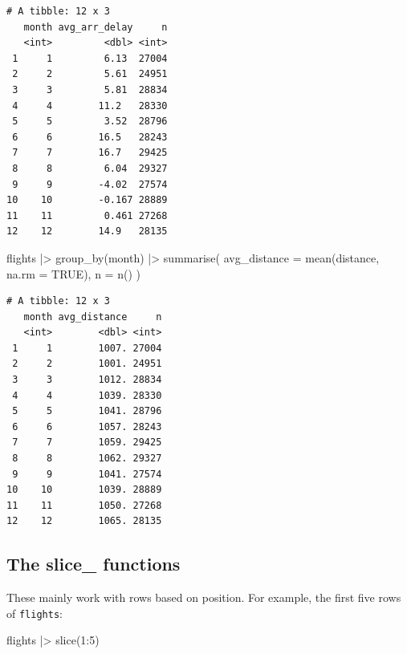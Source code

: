 \documentclass[
  letterpaper,
  DIV=11,
  numbers=noendperiod]{scrreprt}
\newenvironment{Shaded}{\begin{snugshade}}{\end{snugshade}}
\newcommand{\AttributeTok}[1]{\textcolor[rgb]{0.40,0.45,0.13}{#1}}
\newcommand{\ConstantTok}[1]{\textcolor[rgb]{0.56,0.35,0.01}{#1}}
\newcommand{\DecValTok}[1]{\textcolor[rgb]{0.68,0.00,0.00}{#1}}
\newcommand{\FunctionTok}[1]{\textcolor[rgb]{0.28,0.35,0.67}{#1}}
\newcommand{\NormalTok}[1]{\textcolor[rgb]{0.00,0.23,0.31}{#1}}
\newcommand{\SpecialCharTok}[1]{\textcolor[rgb]{0.37,0.37,0.37}{#1}}
\begin{document}
\begin{verbatim}
# A tibble: 12 x 3
   month avg_arr_delay     n
   <int>         <dbl> <int>
 1     1         6.13  27004
 2     2         5.61  24951
 3     3         5.81  28834
 4     4        11.2   28330
 5     5         3.52  28796
 6     6        16.5   28243
 7     7        16.7   29425
 8     8         6.04  29327
 9     9        -4.02  27574
10    10        -0.167 28889
11    11         0.461 27268
12    12        14.9   28135
\end{verbatim}

\begin{Shaded}
\begin{Highlighting}[]
\NormalTok{flights }\SpecialCharTok{|\textgreater{}}
  \FunctionTok{group\_by}\NormalTok{(month) }\SpecialCharTok{|\textgreater{}}
  \FunctionTok{summarise}\NormalTok{(}
    \AttributeTok{avg\_distance =} \FunctionTok{mean}\NormalTok{(distance, }\AttributeTok{na.rm =} \ConstantTok{TRUE}\NormalTok{),}
    \AttributeTok{n =} \FunctionTok{n}\NormalTok{()}
\NormalTok{  )}
\end{Highlighting}
\end{Shaded}

\begin{verbatim}
# A tibble: 12 x 3
   month avg_distance     n
   <int>        <dbl> <int>
 1     1        1007. 27004
 2     2        1001. 24951
 3     3        1012. 28834
 4     4        1039. 28330
 5     5        1041. 28796
 6     6        1057. 28243
 7     7        1059. 29425
 8     8        1062. 29327
 9     9        1041. 27574
10    10        1039. 28889
11    11        1050. 27268
12    12        1065. 28135
\end{verbatim}

\subsection{The slice\_ functions}\label{the-slice_-functions}

These mainly work with rows based on position. For example, the first
five rows of \texttt{flights}:

\begin{Shaded}
\begin{Highlighting}[]
\NormalTok{flights }\SpecialCharTok{|\textgreater{}}
  \FunctionTok{slice}\NormalTok{(}\DecValTok{1}\SpecialCharTok{:}\DecValTok{5}\NormalTok{)}
\end{Highlighting}
\end{Shaded}
\end{document}
